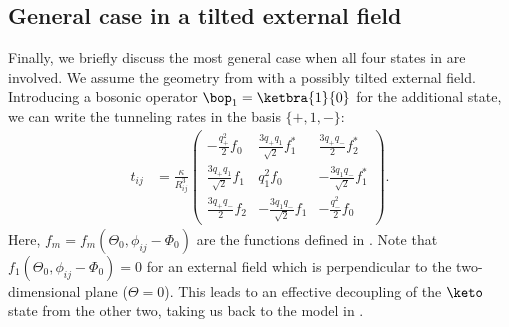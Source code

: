 \subsection{General case in a tilted external field}
Finally, we briefly discuss the most general case when all four states in  are involved. We assume the geometry from  with a possibly tilted external field.
Introducing a bosonic operator $\bop_1=\ketbra{1}{0}$ for the additional state, we can write the tunneling rates in the basis $\{{+}, 1, {-}\}$:
\begin{align}
    t_{ij} &= \frac{\kappa}{R_{ij}^3} \begin{pmatrix}
    -\frac{q_+^2}{2} f_0 & \frac{3q_+ q_1}{\sqrt{2}} f_1^* & \frac{3q_+q_-}{2} f_2^* \\
    \frac{3q_+q_1}{\sqrt{2}} f_1 & q_1^2 f_0 & -\frac{3q_1q_-}{\sqrt{2}} f_1^* \\
    \frac{3q_+q_-}{2} f_2 & -\frac{3q_1q_-}{\sqrt{2}} f_1 & -\frac{q_-^2}{2} f_0
\end{pmatrix}.
\end{align}
Here, $f_m = f_m(\Theta_0, \phi_{ij}-\Phi_0)$ are the functions defined in .
Note that $f_1(\Theta_0, \phi_{ij}-\Phi_0)=0$ for an external field which is perpendicular to the two-dimensional plane ($\Theta=0$). This leads to an effective decoupling of the $\keto$ state from the other two, taking us back to the model in .


